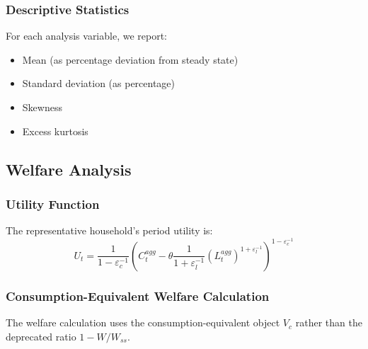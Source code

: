 \documentclass[11pt]{article}
\begin{document}
\subsubsection{Descriptive Statistics}
For each analysis variable, we report:
\begin{itemize}
    \item Mean (as percentage deviation from steady state)
    \item Standard deviation (as percentage)
    \item Skewness
    \item Excess kurtosis
\end{itemize}

\subsection{Welfare Analysis}

\subsubsection{Utility Function}
The representative household's period utility is:
\begin{equation}
    U_t = \frac{1}{1 - \varepsilon_c^{-1}} \left( C^{agg}_t - \theta \frac{1}{1 + \varepsilon_l^{-1}} (L^{agg}_t)^{1 + \varepsilon_l^{-1}} \right)^{1 - \varepsilon_c^{-1}}
\end{equation}

\subsubsection{Consumption-Equivalent Welfare Calculation}
The welfare calculation uses the consumption-equivalent object $V_c$ rather than the deprecated ratio $1-W/W_{ss}$.
\end{document}
